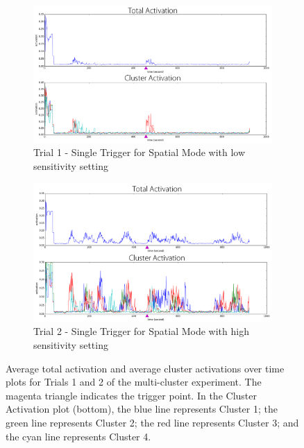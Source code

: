 \begin{figure}[!htbp]
	\centering
	\begin{subfigure}[t]{0.8\textwidth}
		\centering
		\includegraphics[width=1.0 \textwidth]{"fig/validations/multicluster trial 1"}
		\caption{Trial 1 - Single Trigger for Spatial Mode with low sensitivity setting}
		\label{fig:multicluster trial 1}
	\end{subfigure}
	
	\begin{subfigure}[t]{0.8\textwidth}
		\centering
		\includegraphics[width=1.0 \textwidth]{"fig/validations/multicluster trial 2"}
		\caption{Trial 2 - Single Trigger for Spatial Mode with high sensitivity setting}
		\label{fig:multicluster trial 2}
	\end{subfigure}
	\caption[Average total activation and average cluster activations plots for Trials 1 and 2 of the multi-cluster experiment]{Average total activation and average cluster activations over time plots for Trials 1 and 2 of the multi-cluster experiment. The magenta triangle indicates the trigger point. In the Cluster Activation plot (bottom), the blue line represents Cluster 1; the green line represents Cluster 2; the red line represents Cluster 3; and the cyan line represents Cluster 4.}
	\label{fig:multicluster 1-2}
\end{figure}


